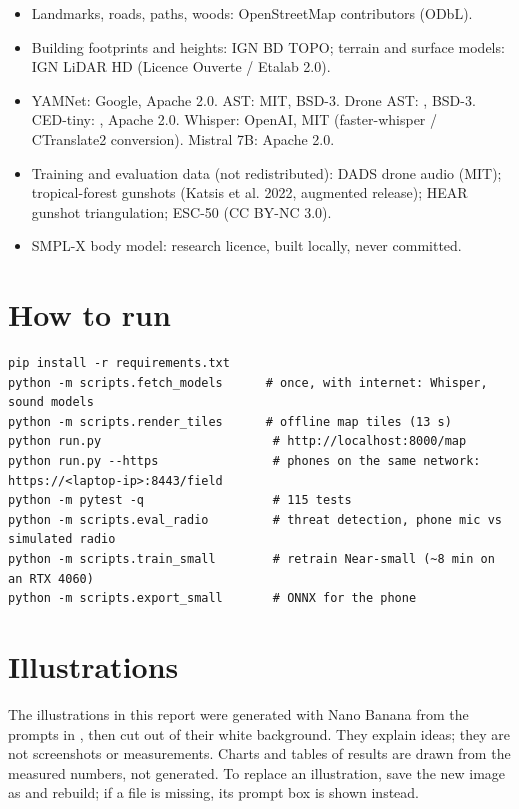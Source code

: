\begin{itemize}
  \item Landmarks, roads, paths, woods: \textcopyright{} OpenStreetMap contributors (ODbL).
  \item Building footprints and heights: IGN BD TOPO; terrain and surface models: IGN LiDAR HD (Licence Ouverte / Etalab 2.0).
  \item YAMNet: Google, Apache 2.0. AST: MIT, BSD-3. Drone AST: , BSD-3.
        CED-tiny: , Apache 2.0. Whisper: OpenAI, MIT (faster-whisper / CTranslate2 conversion).
        Mistral 7B: Apache 2.0.
  \item Training and evaluation data (not redistributed): DADS drone audio (MIT); tropical-forest gunshots (Katsis et al. 2022,
        augmented release); HEAR gunshot triangulation; ESC-50 (CC BY-NC 3.0).
  \item SMPL-X body model: research licence, built locally, never committed.
\end{itemize}

\chapter{How to run}\label{app:run}

\begin{lstlisting}
pip install -r requirements.txt
python -m scripts.fetch_models      # once, with internet: Whisper, sound models
python -m scripts.render_tiles      # offline map tiles (13 s)
python run.py                        # http://localhost:8000/map
python run.py --https                # phones on the same network: https://<laptop-ip>:8443/field
python -m pytest -q                  # 115 tests
python -m scripts.eval_radio         # threat detection, phone mic vs simulated radio
python -m scripts.train_small        # retrain Near-small (~8 min on an RTX 4060)
python -m scripts.export_small       # ONNX for the phone
\end{lstlisting}

\chapter{Illustrations}\label{app:prompts}

The illustrations in this report were generated with Nano Banana from the prompts in ,
then cut out of their white background. They explain ideas; they are not screenshots or measurements. Charts and tables of
results are drawn from the measured numbers, not generated. To replace an illustration, save the new image as
 and rebuild; if a file is missing, its prompt box is shown instead.
